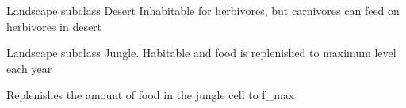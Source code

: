 \documentclass[a4paper,10pt,openany,oneside]{sphinxmanual}
\begin{document}
\begin{fulllineitems}
\label{landscape:biosim.landscape.Desert}
Landscape subclass Desert
Inhabitable for herbivores, but carnivores can feed on herbivores in desert

\end{fulllineitems}


\begin{fulllineitems}
\label{landscape:biosim.landscape.Jungle}
Landscape subclass Jungle.
Habitable and food is replenished to maximum level each year

\begin{fulllineitems}
\label{landscape:biosim.landscape.Jungle.grow_food}
Replenishes the amount of food in the jungle cell to f\_max

\end{fulllineitems}


\end{fulllineitems}

\end{document}
